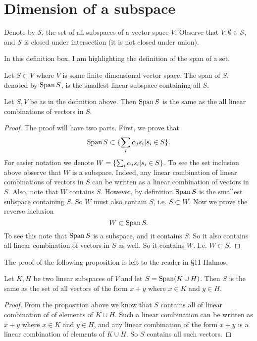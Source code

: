 \section{Dimension of a subspace}
\begin{observation}
	Denote by $ \mathcal{S} $, the set of all subspaces of a vector space $ V $. Observe that $ V,\emptyset \in \mathcal{S} $, and $ \mathcal{S} $ is closed under intersection (it is not closed under union).
\end{observation}

\begin{observation}
	In this definition box, I am highlighting the definition of the span of a set.
	\begin{definition}
		Let $ S \subset V $ where $ V $ is some finite dimensional vector space. The span of $ S $, denoted by $ \operatorname{Span} S $, is the smallest linear subspace containing all $ S $.
	\end{definition}
	\begin{proposition}
		Let $ {S},V $ be as in the definition above. Then $ \operatorname{Span} S $ is the same as the all linear combinations of vectors in $ S $.
	\end{proposition}
	\begin{proof}
		The proof will have two parts. First, we prove that
		\[ \operatorname{Span} S \subset \{\sum_i \alpha_i s_i | s_i \in S\}. \]
		For easier notation we denote $ W = \{\sum_i \alpha_i s_i | s_i \in S\} $. To see the set inclusion above observe that $ W $ is a subspace. Indeed, any linear combination of linear combinations of vectors in $ S $ can be written as a linear combination of vectors in $ S $. Also, note that $ W  $ contains $ S $. However, by definition $ \operatorname{Span} S $ is the smallest subspace containing $ S $. So $ W $ must also contain $ S $, i.e. $ S\subset W $. Now we prove the reverse inclusion
		\[ W \subset \operatorname{Span} S. \]
		To see this note that $ \operatorname{Span} S $ is a subspace, and it contains $ S $. So it also contains all linear combination of vectors in $ S $ as well. So it contains $ W $. I.e. $ W\subset S $.
	\end{proof}
	The proof of the following proposition is left to the reader in \S11 Halmos.
	\begin{proposition}
		Let $ K,H $ be two linear subspaces of $ V $ and let $ S = \operatorname{Span} (K\cup H) $. Then $ S $ is the same as the set of all vectors of the form $ x+y $ where $ x\in K $ and $ y\in H $. 
	\end{proposition}
	\begin{proof}
		From the proposition above we know that $ S $ contains all of linear combination of of elements of $ K\cup H $. Such a linear combination can be written as $ x + y $ where $ x \in K $ and $ y \in H $, and any linear combination of the form $ x+y $ is a linear combination of elements of $ K\cup H $. So $ S $ contains all such vectors.
	\end{proof}
\end{observation}



